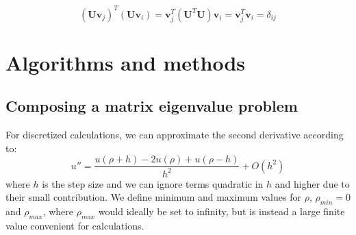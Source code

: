 \documentclass[10pt,showpacs,preprintnumbers,footinbib,amsmath,amssymb,aps,prl,twocolumn,groupedaddress,superscriptaddress,showkeys]{revtex4-1}
\begin{document}
\begin{equation*}
\left(\mathbf{U} \mathbf{v}_j \right )^T \left(\mathbf{U} \mathbf{v}_i \right ) 
= \mathbf{v}_j^T\left (\mathbf{U}^T\mathbf{U} \right )\mathbf{v}_i = \mathbf{v}_j^T \mathbf{v}_i  = \delta_{ij}
\end{equation*}
\section{Algorithms and methods}
\subsection{Composing a matrix eigenvalue problem}
For discretized calculations, we can approximate the second derivative according to:
\begin{equation}
u''=\frac{u(\rho+h)-2u(\rho)+u(\rho-h)}{h^2}+O(h^2)
\end{equation}
where $h$ is the step size and we can ignore terms quadratic in $h$ and higher due to their small contribution. We define minimum and maximum values for $\rho$, $\rho_{min} = 0$ and $\rho_{max}$, where $\rho_{max}$ would ideally be set to infinity, but is instead a large finite value convenient for calculations.
\end{document}

